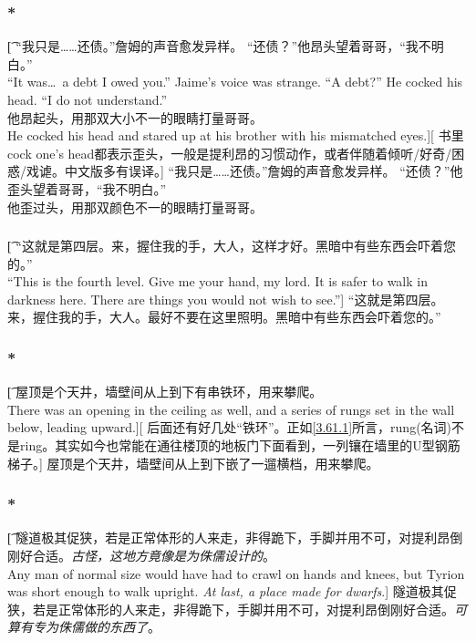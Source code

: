 \documentclass[12pt,a4paper]{article}
\begin{document}
\subsubsection{\color{red}*}\t[	
	“我只是……还债。”詹姆的声音愈发异样。
	“还债？”他昂头望着哥哥，“我不明白。”\\
	“It was\ldots a debt I owed you.” Jaime's voice was strange.
	“A debt?” He cocked his head. “I do not understand.”\\
	他昂起头，用那双大小不一的眼睛打量哥哥。\\
	He cocked his head and stared up at his brother with his mismatched eyes.][
	书里cock one's head都表示歪头，一般是提利昂的习惯动作，或者伴随着倾听/好奇/困惑/戏谑。中文版多有误译。]
	“我只是……还债。”詹姆的声音愈发异样。
	“还债？”他歪头望着哥哥，“我不明白。”\\
	他歪过头，用那双颜色不一的眼睛打量哥哥。
	
\subsubsection{}\t[
	“这就是第四层。来，握住我的手，大人，这样才好。黑暗中有些东西会吓着您的。”\\
	“This is the fourth level. Give me your hand, my lord. It is safer to walk in darkness here. There are things you would not wish to see.”]
	“这就是第四层。来，握住我的手，大人。最好不要在这里照明。黑暗中有些东西会吓着您的。”
	
\subsubsection{\color{red}*}\t[
	屋顶是个天井，墙壁间从上到下有串铁环，用来攀爬。\\
	There was an opening in the ceiling as well, and a series of rungs set in the wall below, leading upward.][
	后面还有好几处“铁环”。正如\ref{3.61.1}所言，rung(名词)不是ring。其实如今也常能在通往楼顶的地板门下面看到，一列镶在墙里的U型钢筋梯子。]
	屋顶是个天井，墙壁间从上到下嵌了一遛横档，用来攀爬。

\subsubsection{\color{red}*}\t[
	隧道极其促狭，若是正常体形的人来走，非得跪下，手脚并用不可，对提利昂倒刚好合适。\emph{古怪，这地方竟像是为侏儒设计的}。\\
	Any man of normal size would have had to crawl on hands and knees, but Tyrion was short enough to walk upright. \emph{At last, a place made for dwarfs}.]
	隧道极其促狭，若是正常体形的人来走，非得跪下，手脚并用不可，对提利昂倒刚好合适。\emph{可算有专为侏儒做的东西了}。
	
\end{document}
